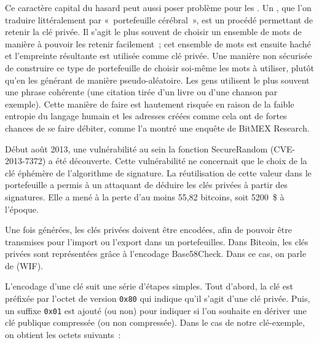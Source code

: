 Ce caractère capital du hasard peut aussi poser problème pour les . Un , que l'on traduire littéralement par «~portefeuille cérébral~», est un procédé permettant de retenir la clé privée. Il s'agit le plus souvent de choisir un ensemble de mots de manière à pouvoir les retenir facilement~; cet ensemble de mots est ensuite haché et l'empreinte résultante est utilisée comme clé privée. Une manière non sécurisée de construire ce type de portefeuille de choisir soi-même les mots à utiliser, plutôt qu'en les générant de manière pseudo-aléatoire. Les gens utilisent le plus souvent une phrase cohérente (une citation tirée d'un livre ou d'une chanson par exemple).  Cette manière de faire est hautement risquée en raison de la faible entropie du langage humain et les adresses créées comme cela ont de fortes chances de se faire débiter, comme l'a montré une enquête de BitMEX Research. 

Début août 2013, une vulnérabilité au sein la fonction SecureRandom (CVE-2013-7372) a été découverte. Cette vulnérabilité ne concernait que le choix de la clé éphémère de l'algorithme de signature. La réutilisation de cette valeur dans le portefeuille a permis à un attaquant de déduire les clés privées à partir des signatures. Elle a mené à la perte d'au moins 55,82 bitcoins, soit 5200~\$ à l'époque.


Une fois générées, les clés privées doivent être encodées, afin de pouvoir être transmises pour l'import ou l'export dans un portefeuilles. Dans Bitcoin, les clés privées sont représentées grâce à l'encodage Base58Check. Dans ce cas, on parle de  (WIF).

L'encodage d'une clé suit une série d'étapes simples. Tout d'abord, la clé est préfixée par l'octet de version \verb?0x80? qui indique qu'il s'agit d'une clé privée. Puis, un suffixe \verb?0x01? est ajouté (ou non) pour indiquer si l'on souhaite en dériver une clé publique compressée (ou non compressée). Dans le cas de notre clé-exemple, on obtient les octets suivants~:

